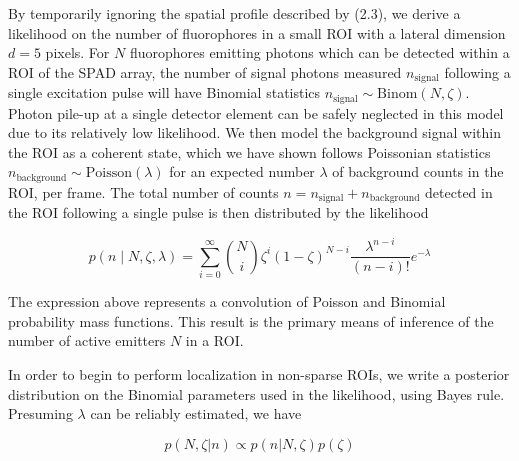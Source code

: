 

By temporarily ignoring the spatial profile described by (2.3), we derive a likelihood on the number of fluorophores in a small ROI with a lateral dimension $d = 5$ pixels. For $N$ fluorophores emitting photons which can be detected within a ROI of the SPAD array, the number of signal photons measured $n_{\mathrm{signal}}$ following a single excitation pulse will have Binomial statistics $n_{\mathrm{signal}} \sim \mathrm{Binom}(N,\zeta)$. Photon pile-up at a single detector element can be safely neglected in this model due to its relatively low likelihood. We then model the background signal within the ROI as a coherent state, which we have shown follows Poissonian statistics $n_{\mathrm{background}} \sim \mathrm{Poisson}(\lambda)$ for an expected number $\lambda$ of background counts in the ROI, per frame. The total number of counts $n=n_{\mathrm{signal}}+n_{\mathrm{background}}$ detected in the ROI following a single pulse is then distributed by the likelihood

\begin{equation}
p(n \mid N,\zeta,\lambda) = \sum_{i=0}^{\infty} \binom{N}{i} \zeta^i (1-\zeta)^{N-i} \frac{\lambda^{n-i}}{(n-i)!} e^{-\lambda}
\end{equation}

The expression above represents a convolution of Poisson and Binomial probability mass functions. This result is the primary means of inference of the number of active emitters $N$ in a ROI.

In order to begin to perform localization in non-sparse ROIs, we write a posterior distribution on the Binomial parameters used in the likelihood, using Bayes rule. Presuming $\lambda$ can be reliably estimated, we have

\begin{equation}
p(N,\zeta\lvert n) \propto p(n\lvert N,\zeta)p(\zeta)
\end{equation}

